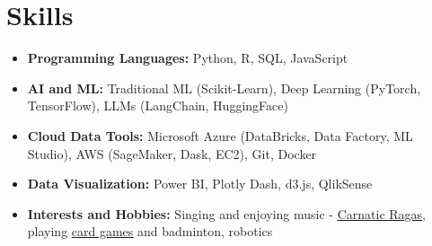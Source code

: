 \documentclass[letterpaper,11pt]{article}
\newcommand{\resumeItem}[1]{
\justifying
  \item{\small{#1}}
  \vspace{-2px}
}
\newcommand{\resumeItemListStart}{
  \vspace{-3pt}
  \begin{itemize}[leftmargin=0.2in, label=\textbullet]
}
\newcommand{\resumeItemListEnd}{\end{itemize}}
\begin{document}
\vspace{-16pt}
\section{\Large{Skills}}
\vspace{3pt}
\begin{itemize}[leftmargin=0.00in, label={}, itemsep=0pt, parsep=0pt]
    \item{
        \small{\textbf{Programming Languages:}}
        \small{Python, R, SQL, JavaScript} 
        }



    \item{
        \small{\textbf{AI and ML:}}
        \small{Traditional ML (Scikit-Learn), Deep Learning (PyTorch, TensorFlow), LLMs (LangChain, HuggingFace)}
        }

    \item{
        \small{\textbf{Cloud Data Tools:}}
        \small{Microsoft Azure (DataBricks, Data Factory, ML Studio), AWS (SageMaker, Dask, EC2), Git, Docker}
        }

    \item{
        \small{\textbf{Data Visualization:}}
        \small{Power BI, Plotly Dash, d3.js, QlikSense}
        }
    \item{
    \small{\textbf{Interests and Hobbies:}}
    \small{Singing and enjoying music - \href{https://vishuragams.pages.dev}{\underline{Carnatic Ragas}}, playing \href{https://vishugp.github.io/Thuruppu/}{\underline{card games}} and badminton, robotics}
    }
\end{itemize}


\end{document}
